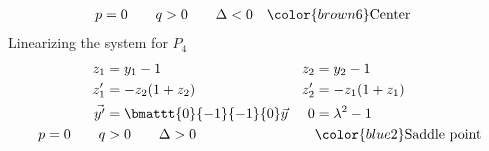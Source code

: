 \begin{enumerate}
\begin{align}
              p = 0 \qquad q & > 0 \qquad \Delta < 0          &
                             & \color{brown6} \text{Center}
          \end{align}
          Linearizing the system for $ P_4 $
          \begin{align}
              z_1            & = y_1 - 1                         &
              z_2            & = y_2 - 1                           \\
              z_1'           & = -z_2(1 + z_2)                   &
              z_2'           & = -z_1(1 + z_1)                     \\
              \vec{y'}       & = \bmattt{0}{-1}{-1}{0} \vec{y}   &
              0              & = \lambda^{2} - 1                   \\
              p = 0 \qquad q & > 0 \qquad \Delta > 0             &
                             & \color{blue2} \text{Saddle point}
          \end{align}


\end{enumerate}
